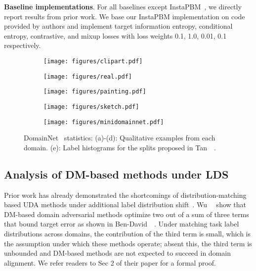 \documentclass[10pt,twocolumn,letterpaper]{article}
\begin{document}
\noindent \textbf{Baseline implementations}. For all baselines except InstaPBM~\cite{li2020rethinking}, we directly report results from prior work. We base our InstaPBM implementation on code provided by authors and implement target information entropy, conditional entropy, contrastive, and mixup losses with loss weights 0.1, 1.0, 0.01, 0.1 respectively.


\begin{figure*}
    \centering
    \begin{subfigure}[b]{0.24\textwidth}  
        \centering 
        \texttt{[image: figures/clipart.pdf]}
        \caption[]{{}}   
        \label{fig:clipart}
    \end{subfigure}
    \begin{subfigure}[b]{0.24\textwidth}
        \centering
        \texttt{[image: figures/real.pdf]}
        \caption[]{{}}
        \label{fig:real}
    \end{subfigure}
    \begin{subfigure}[b]{0.24\textwidth}
        \centering
        \texttt{[image: figures/painting.pdf]}
        \caption[]{{}}
        \label{fig:painting}
    \end{subfigure}
    \begin{subfigure}[b]{0.24\textwidth}
        \centering
        \texttt{[image: figures/sketch.pdf]}
        \caption[]{{}}
        \label{fig:sketch}
    \end{subfigure}
    \begin{subfigure}[b]{0.7\textwidth}
        \centering
        \texttt{[image: figures/minidomainnet.pdf]}
        \caption[]{{}}
        \label{fig:minidn}
    \end{subfigure}
    \caption[]
    {DomainNet~\cite{peng2019moment} statistics: (a)-(d): Qualitative examples from each domain. (e): Label histograms for the splits proposed in Tan~\etal~\cite{tan2019generalized}.}
    \label{fig:domainnet_qual}
\end{figure*}

\subsection{Analysis of DM-based methods under LDS} 

Prior work has already demonstrated the shortcomings of distribution-matching based UDA methods under additional label distribution shift~\cite{wu2019domain,li2020rethinking}. Wu~\etal~\cite{wu2019domain} show that DM-based domain adversarial methods optimize two out of a sum of three terms that bound target error as shown in Ben-David~\etal~\cite{ben2010theory}. Under matching task label distributions across domains, the contribution of the third term is small, which is the assumption under which these methods operate; absent this, the third term is unbounded and DM-based methods are not expected to succeed in domain alignment. We refer readers to Sec 2 of their paper for a formal proof. 
\end{document}
